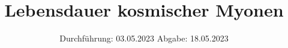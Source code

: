 

\subject{VERSUCH 01}
\title{Lebensdauer kosmischer Myonen}
\date{
  Durchführung: 03.05.2023
  \hspace{3em}
  Abgabe: 18.05.2023
}



\maketitle
\newpage

\setcounter{page}{1}








\newpage
\printbibliography{}

\newpage


% 

